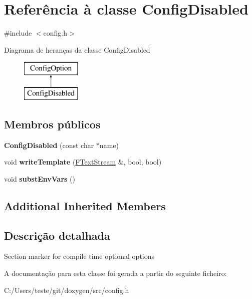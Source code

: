 \hypertarget{class_config_disabled}{\section{Referência à classe Config\-Disabled}
\label{class_config_disabled}
}


{\ttfamily \#include $<$config.\-h$>$}

Diagrama de heranças da classe Config\-Disabled\begin{figure}[H]
\begin{center}
\leavevmode
\includegraphics[height=2.000000cm]{class_config_disabled}
\end{center}
\end{figure}
\subsection*{Membros públicos}
\begin{DoxyCompactItemize}
\item 
\hypertarget{class_config_disabled_ab2755c9289b5146e929d7d9b7d7f86a2}{{\bfseries Config\-Disabled} (const char $\ast$name)}\label{class_config_disabled_ab2755c9289b5146e929d7d9b7d7f86a2}

\item 
\hypertarget{class_config_disabled_a7532aae29d4f94af257d952948ec64ca}{void {\bfseries write\-Template} (\hyperlink{class_f_text_stream}{F\-Text\-Stream} \&, bool, bool)}\label{class_config_disabled_a7532aae29d4f94af257d952948ec64ca}

\item 
\hypertarget{class_config_disabled_a79866440425087f224d4f77311efad6a}{void {\bfseries subst\-Env\-Vars} ()}\label{class_config_disabled_a79866440425087f224d4f77311efad6a}

\end{DoxyCompactItemize}
\subsection*{Additional Inherited Members}


\subsection{Descrição detalhada}
Section marker for compile time optional options 

A documentação para esta classe foi gerada a partir do seguinte ficheiro\-:\begin{DoxyCompactItemize}
\item 
C\-:/\-Users/teste/git/doxygen/src/config.\-h\end{DoxyCompactItemize}
